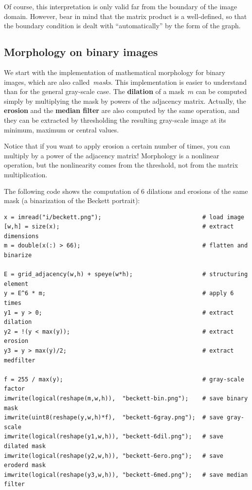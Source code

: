 Of course, this interpretation is only valid far from the boundary of the
image domain.  However, bear in mind that the matrix product is a well-defined,
so that the boundary condition is dealt with ``automatically'' by the form of
the graph.

\subsection{Morphology on binary images}


We start with the implementation of mathematical morphology for binary
images, which are also called~\emph{masks}.
This implementation is easier to understand than for the
general gray-scale case.
The {\bf dilation} of a mask~$m$ can be computed simply by multiplying the
mask by powers of the adjacency matrix.  Actually, the {\bf erosion} and the
{\bf median filter} are also computed by the same operation, and they can be
extracted by thresholding the resulting gray-scale image at its minimum,
maximum or central values.

Notice that if you want to apply erosion a certain number of times, you can
multiply by a power of the adjacency matrix!  Morphology is a nonlinear
operation, but the nonlinearity comes from the threshold, not from the
matrix multiplication.

The following code shows the computation of 6 dilations and erosions of the
same mask (a binarization of the Beckett portrait):

\begin{verbatim}
x = imread("i/beckett.png");                             # load image
[w,h] = size(x);                                         # extract dimensions
m = double(x(:) > 66);                                   # flatten and binarize

E = grid_adjacency(w,h) + speye(w*h);                    # structuring element
y = E^6 * m;                                             # apply 6 times
y1 = y > 0;                                              # extract dilation
y2 = !(y < max(y));                                      # extract erosion
y3 = y > max(y)/2;                                       # extract medfilter

f = 255 / max(y);                                        # gray-scale factor
imwrite(logical(reshape(m,w,h)),  "beckett-bin.png");    # save binary mask
imwrite(uint8(reshape(y,w,h)*f),  "beckett-6gray.png");  # save gray-scale
imwrite(logical(reshape(y1,w,h)), "beckett-6dil.png");   # save dilated mask
imwrite(logical(reshape(y2,w,h)), "beckett-6ero.png");   # save eroderd mask
imwrite(logical(reshape(y3,w,h)), "beckett-6med.png");   # save median filter
\end{verbatim}


